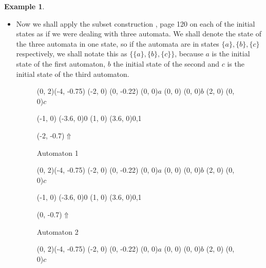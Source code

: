 \documentclass{article}
\theoremstyle{definition}
\newtheorem{example}[theorem]{Example}
\begin{document}
\begin{example}
\begin{itemize}
\begin{figure}[H]
\begin{graph}
  \freetext(-2, -0.7){$\Uparrow$}
  \freetext(0, -0.7){$\Uparrow$}
  \freetext(2, -0.7){$\Uparrow$}
\end{graph}
\caption{A non-deterministic automaton in reverse reading}
\label{fig:nondet_reverse}
\end{figure}

\item Now we shall apply the subset construction \cite{Wood}, page 120
      on each of the initial states as if we were dealing with three automata. 
      We shall denote the state of the three automata in one state, so if
      the automata are in states $\{a\}, \{b\}, \{c\}$ respectively, we shall 
      notate this as $\{\{a\}, \{b\}, \{c\}\}$, because $a$ is the initial 
      state of the first automaton, $b$ the initial state of the second and 
      $c$ is the initial state of the third automaton.

\begin{figure}[H]
\begin{graph}(0, 2)(-4, -0.75)
  (-2, 0) 
    (0, -0.22){} (0, 0){$a$}
  (0, 0) (0, 0){$b$}
  (2, 0) (0, 0){$c$}

  (-1, 0) \freetext(-3.6, 0){0}
   
   
  (1, 0) \freetext(3.6, 0){0,1}

  \freetext(-2, -0.7){$\Uparrow$}
\end{graph}
\caption{Automaton 1}
\label{fig:nondet_reverse1}
\end{figure}
\begin{figure}[H]
\begin{graph}(0, 2)(-4, -0.75)
  (-2, 0) 
    (0, -0.22){} (0, 0){$a$}
  (0, 0) (0, 0){$b$}
  (2, 0) (0, 0){$c$}

  (-1, 0) \freetext(-3.6, 0){0}
   
   
  (1, 0) \freetext(3.6, 0){0,1}

  \freetext(0, -0.7){$\Uparrow$}
\end{graph}
\caption{Automaton 2}
\label{fig:nondet_reverse2}
\end{figure}
\begin{figure}[H]
\begin{graph}(0, 2)(-4, -0.75)
  (-2, 0) 
    (0, -0.22){} (0, 0){$a$}
  (0, 0) (0, 0){$b$}
  (2, 0) (0, 0){$c$}


\end{graph}
\end{figure}
\end{itemize}
\end{example}
\end{document}
